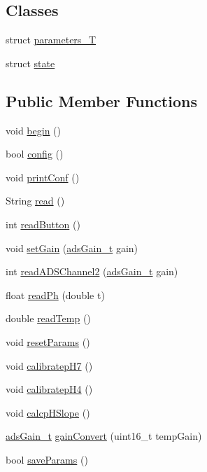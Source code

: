 \subsection*{Classes}
\begin{DoxyCompactItemize}
\item 
struct \hyperlink{struct_irene3000_1_1parameters___t}{parameters\+\_\+T}
\item 
struct \hyperlink{struct_irene3000_1_1state}{state}
\end{DoxyCompactItemize}
\subsection*{Public Member Functions}
\begin{DoxyCompactItemize}
\item 
void \hyperlink{class_irene3000_ad5891806c500ae1007afe52b9e304c2b}{begin} ()
\item 
bool \hyperlink{class_irene3000_afed5c35e4b23963c157847ef27c11e9c}{config} ()
\item 
void \hyperlink{class_irene3000_a7bc2414100b5e19eacc6630fa34b2654}{print\+Conf} ()
\item 
String \hyperlink{class_irene3000_a852a170feea994ea1df01c6b245b5d9a}{read} ()
\item 
int \hyperlink{class_irene3000_a78a87eb7cf295b95c12b2ebd51c2bb77}{read\+Button} ()
\item 
void \hyperlink{class_irene3000_aff7c5da186b388e7272e63ff88a20c34}{set\+Gain} (\hyperlink{_cool_adafruit___a_d_s1015_8h_a3d6c0e15829a207b9155890811fa4781}{ads\+Gain\+\_\+t} gain)
\item 
int \hyperlink{class_irene3000_ae73bd2ed14a199a7e83f4d6458476a7c}{read\+A\+D\+S\+Channel2} (\hyperlink{_cool_adafruit___a_d_s1015_8h_a3d6c0e15829a207b9155890811fa4781}{ads\+Gain\+\_\+t} gain)
\item 
float \hyperlink{class_irene3000_a436fc0a06681cd0784aba56b9707f19a}{read\+Ph} (double t)
\item 
double \hyperlink{class_irene3000_a80bc6dfea106dc3bc54fa20204d4d5dc}{read\+Temp} ()
\item 
void \hyperlink{class_irene3000_a43b0e44f8d211413ff4e3a0c654205ff}{reset\+Params} ()
\item 
void \hyperlink{class_irene3000_a1d3299202e4cb7afcff9c9e3e95d94c1}{calibratep\+H7} ()
\item 
void \hyperlink{class_irene3000_aa140dd026922a04981edfd04d46cabbe}{calibratep\+H4} ()
\item 
void \hyperlink{class_irene3000_a81f6a79e546679692053f7ac1af49613}{calcp\+H\+Slope} ()
\item 
\hyperlink{_cool_adafruit___a_d_s1015_8h_a3d6c0e15829a207b9155890811fa4781}{ads\+Gain\+\_\+t} \hyperlink{class_irene3000_abcad62d1201a59f8dd3ba87048002728}{gain\+Convert} (uint16\+\_\+t temp\+Gain)
\item 
bool \hyperlink{class_irene3000_a63dbd38e79b8cd5f1fba4b245501a894}{save\+Params} ()
\end{DoxyCompactItemize}
